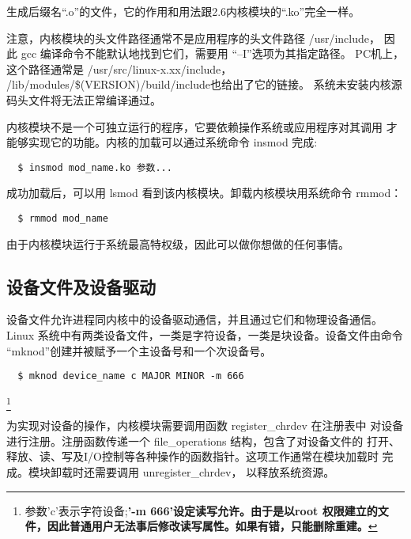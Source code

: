 生成后缀名``.o''的文件，它的作用和用法跟2.6内核模块的``.ko''完全一样。

	注意，内核模块的头文件路径通常不是应用程序的头文件路径 /usr/include，
因此 gcc 编译命令不能默认地找到它们，需要用 ``--I''选项为其指定路径。
PC机上，这个路径通常是 /usr/src/linux-x.xx/include，
/lib/modules/\$(VERSION)/build/include也给出了它的链接。
系统未安装内核源码头文件将无法正常编译通过。

	内核模块不是一个可独立运行的程序，它要依赖操作系统或应用程序对其调用
才能够实现它的功能。内核的加载可以通过系统命令 insmod 完成:

\begin{boxedminipage}{.9\textwidth}
\begin{verbatim}
  $ insmod mod_name.ko 参数...
\end{verbatim}
\end{boxedminipage}

	成功加载后，可以用 lsmod 看到该内核模块。卸载内核模块用系统命令 rmmod：

\begin{boxedminipage}{.9\textwidth}
\begin{verbatim}
  $ rmmod mod_name
\end{verbatim}
\end{boxedminipage}

    由于内核模块运行于系统最高特权级，因此可以做你想做的任何事情。
\subsection{设备文件及设备驱动}
    设备文件允许进程同内核中的设备驱动通信，并且通过它们和物理设备通信。
Linux 系统中有两类设备文件，一类是字符设备，一类是块设备。设备文件由命令
``mknod''创建并被赋予一个主设备号和一个次设备号。

\begin{boxedminipage}{.9\textwidth}
\begin{verbatim}
  $ mknod device_name c MAJOR MINOR -m 666
\end{verbatim}
\end{boxedminipage}
\footnote{参数'c'表示字符设备;{\bf '-m 666'设定读写允许。由于是以root
权限建立的文件，因此普通用户无法事后修改读写属性。如果有错，只能删除重建。}}

    为实现对设备的操作，内核模块需要调用函数 register\_chrdev 在注册表中
对设备进行注册。注册函数传递一个 file\_operations 结构，包含了对设备文件的
打开、释放、读、写及I/O控制等各种操作的函数指针。这项工作通常在模块加载时
完成。模块卸载时还需要调用 unregister\_chrdev， 以释放系统资源。

